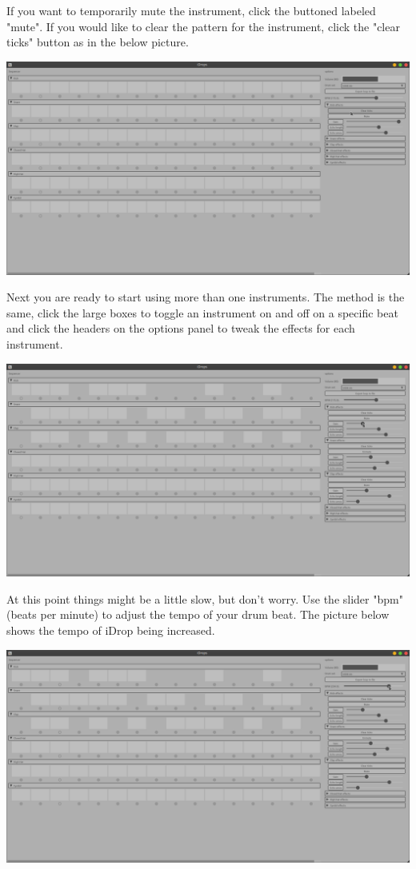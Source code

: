 \documentclass[11pt]{article}
\begin{document}
If you want to temporarily mute the instrument, click the buttoned labeled "mute".
If you would like to clear the pattern for the instrument, click the "clear ticks"
button as in the below picture.
\begin{center}
\includegraphics[width=15cm]{./6.png}
\end{center}

Next you are ready to start using more than one instruments. The method is the same,
click the large boxes to toggle an instrument on and off on a specific beat and click
the headers on the options panel to tweak the effects for each instrument.
\begin{center}
\includegraphics[width=15cm]{./7.png}
\end{center}


At this point things might be a little slow, but don't worry. Use the
slider "bpm" (beats per minute) to adjust the tempo of your drum beat.
The picture below shows the tempo of iDrop being increased.
\begin{center}
\includegraphics[width=15cm]{./8.png}
\end{center}
\end{document}
